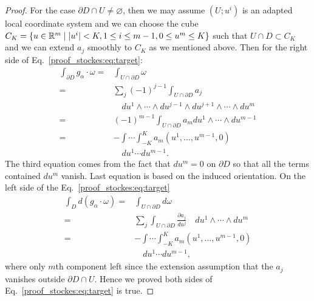 \begin{proof}
For the case $\partial D\cap U\ne\varnothing$, then we may assume $(U;u^i)$ is an adapted local coordinate system and we can choose the cube $C_K=\{u\in\mathbb{R}^m\mid |u^i|<K,1\le i\le m-1,0\le u^m\le K\}$ such that $U\cap D\subset C_K$ and we can extend $a_j$ smoothly to $C_K$ as we mentioned above. Then for the right side of Eq.~\ref{proof_stockes:eq:target}:
\begin{equation*}
\begin{aligned}
\int_{\partial D}g_\alpha\cdot\omega=&\int_{U\cap \partial D}\omega\\
=&\sum_j(-1)^{j-1}\int_{U\cap \partial D}a_j\\
&\quad du^1\wedge\cdots\wedge du^{j-1}\wedge du^{j+1}\wedge\cdots\wedge du^m\\
=&(-1)^{m-1}\int_{U\cap \partial D}a_mdu^1\wedge\cdots\wedge du^{m-1}\\
=&-\int\cdots\int_{-K}^Ka_m(u^1,\dots,u^{m-1},0)\\
&\quad du^1\cdots du^{m-1}.
\end{aligned}
\end{equation*}
The third equation comes from the fact that $du^m=0$ on $\partial D$ so that all the terms contained $du^m$ vanish. Last equation is based on the induced orientation. 
On the left side of the Eq.~\ref{proof_stockes:eq:target}
\begin{equation*}
\begin{aligned}
\int_{D}d(g_\alpha\cdot\omega)=&\int_{U\cap \partial D}d\omega\\
=&\sum_j\int_{U\cap \partial D}\frac{\partial a_j}{du^j}\quad du^1\wedge\cdots\wedge du^m\\
=&-\int\cdots\int_{-K}^Ka_m(u^1,\dots,u^{m-1},0)\\
&\quad du^1\cdots du^{m-1},
\end{aligned}
\end{equation*}
where only $m$th component left since the extension assumption that the $a_j$ vanishes outside $\partial D\cap U$. Hence we proved both sides of Eq.~\ref{proof_stockes:eq:target} is true.
\end{proof}